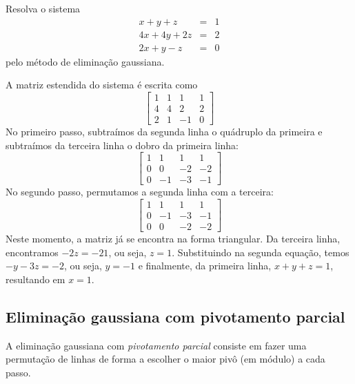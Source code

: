 \begin{ex}\label{ex:elim_gaussiana} Resolva o sistema
  \begin{eqnarray*}
    x+y+z  &=& 1\\
    4x+4y+2z&=& 2\\
    2x+y-z &=& 0
  \end{eqnarray*}
pelo método de eliminação gaussiana.
\end{ex}
\begin{sol}
A matriz estendida do sistema é escrita como
\begin{equation*}
  \begin{bmatrix}
      1 &1& 1&1\\
      4 & 4 &2&2\\
      2 &1& -1&0    
  \end{bmatrix}
\end{equation*}
No primeiro passo, subtraímos da segunda linha o quádruplo da primeira e subtraímos da terceira linha o dobro da primeira linha:
\begin{equation*}
  \begin{bmatrix}
       1 &1& 1&1\\
       0 & 0 &-2&-2\\
       0 &-1& -3&-1    
  \end{bmatrix}
\end{equation*}
No segundo passo, permutamos a segunda linha com a terceira:
\begin{equation*}
  \begin{bmatrix}
       1 &1& 1&1\\
       0 &-1& -3&-1\\
       0 & 0 &-2&-2    
  \end{bmatrix}
\end{equation*}
Neste momento, a matriz já se encontra na forma triangular. Da terceira linha, encontramos $-2z=-21$, ou seja, $z=1$. Substituindo na segunda equação, temos $-y-3z=-2$, ou seja, $y=-1$ e finalmente, da primeira linha, $x+y+z=1$, resultando em $x=1$.
\end{sol}

\subsection{Eliminação gaussiana com pivotamento parcial}
A eliminação gaussiana com \emph{pivotamento parcial} consiste em fazer uma permutação de linhas de forma a escolher o maior pivô (em módulo) a cada passo.

